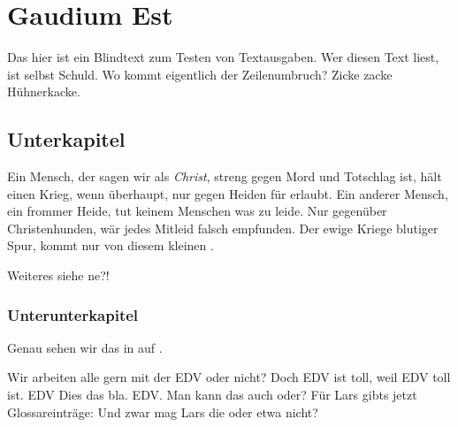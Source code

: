 \section{Gaudium Est}

Das hier ist ein Blindtext zum Testen von Textausgaben. Wer diesen Text liest, ist selbst Schuld. Wo
kommt eigentlich der Zeilenumbruch? Zicke zacke Hühnerkacke.

\subsection{Unterkapitel}

Ein Mensch, der sagen wir als \emph{Christ}, streng gegen Mord und Totschlag ist, hält einen Krieg,
wenn überhaupt, nur gegen Heiden für erlaubt. Ein anderer Mensch, ein frommer Heide, tut keinem Menschen
was zu leide. Nur gegenüber Christenhunden, wär jedes Mitleid falsch empfunden. Der ewige Kriege
blutiger Spur, kommt nur von diesem kleinen . 

Weiteres siehe  ne?!

\subsubsection{Unterunterkapitel}


Genau sehen wir das in  auf .


Wir arbeiten alle gern mit der \acs{EDV} oder nicht? Doch \acl{EDV} ist toll, weil \ac{EDV} toll
ist. \ac{EDV} Dies das bla. \acf{EDV}. Man kann das auch oder? Für Lars gibts jetzt Glossareinträge:
Und zwar mag Lars die  oder etwa nicht?

